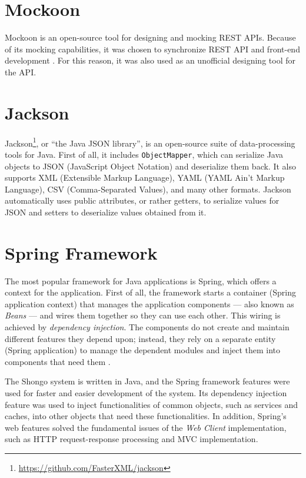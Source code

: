 \section{Mockoon} \label{sec:mockoon}
Mockoon is an open-source tool for designing and mocking REST APIs.
Because of its mocking capabilities, it was chosen to synchronize REST API and front-end development \cite{drobnakm}.
For this reason, it was also used as an unofficial designing tool for the API.


\section{Jackson} \label{sec:jackson}
Jackson\footnote{\url{https://github.com/FasterXML/jackson}}, or \enquote{the Java JSON library}, is an open-source suite of data-processing tools for Java. First of all, it includes \texttt{ObjectMapper}, which can serialize Java objects to JSON (JavaScript Object Notation) and deserialize them back.
It also supports XML (Extensible Markup Language), YAML (YAML Ain't Markup Language), CSV (Comma-Separated Values), and many other formats.
Jackson automatically uses public attributes, or rather getters, to serialize values for JSON and setters to deserialize values obtained from it.


\section{Spring Framework} \label{sec:spring}
The most popular framework for Java applications is Spring, which offers a context for the application.
First of all, the framework starts a container (Spring application context) that manages the application components --- also known as \emph{Beans} --- and wires them together so they can use each other. This wiring is achieved by \emph{dependency injection}.
The components do not create and maintain different features they depend upon; instead, they rely on a separate entity (Spring application) to manage the dependent modules and inject them into components that need them \cite{walls2022spring}.

The Shongo system is written in Java, and the Spring framework features were used for faster and easier development of the system. Its dependency injection feature was used to inject functionalities of common objects, such as services and caches, into other objects that need these functionalities. In addition, Spring’s web features solved the fundamental issues of the \emph{Web Client} implementation, such as HTTP request-response processing and MVC implementation.

